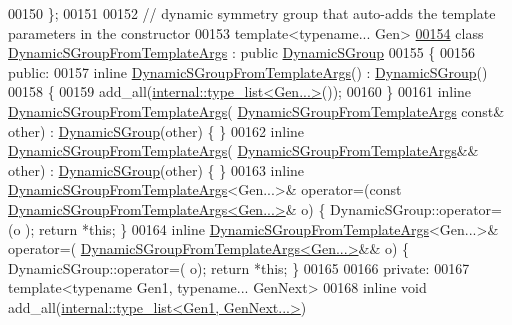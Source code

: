 \begin{DoxyCode}
00150 \};
00151 
00152 \textcolor{comment}{// dynamic symmetry group that auto-adds the template parameters in the constructor}
00153 \textcolor{keyword}{template}<\textcolor{keyword}{typename}... Gen>
\hyperlink{class_eigen_1_1_dynamic_s_group_from_template_args}{00154} \textcolor{keyword}{class }\hyperlink{class_eigen_1_1_dynamic_s_group_from_template_args}{DynamicSGroupFromTemplateArgs} : \textcolor{keyword}{public} 
      \hyperlink{class_eigen_1_1_dynamic_s_group}{DynamicSGroup}
00155 \{
00156   \textcolor{keyword}{public}:
00157     \textcolor{keyword}{inline} \hyperlink{class_eigen_1_1_dynamic_s_group_from_template_args}{DynamicSGroupFromTemplateArgs}() : 
      \hyperlink{class_eigen_1_1_dynamic_s_group}{DynamicSGroup}()
00158     \{
00159       add\_all(\hyperlink{struct_eigen_1_1internal_1_1type__list}{internal::type\_list<Gen...>}());
00160     \}
00161     \textcolor{keyword}{inline} \hyperlink{class_eigen_1_1_dynamic_s_group_from_template_args}{DynamicSGroupFromTemplateArgs}(
      \hyperlink{class_eigen_1_1_dynamic_s_group_from_template_args}{DynamicSGroupFromTemplateArgs} \textcolor{keyword}{const}& other) : 
      \hyperlink{class_eigen_1_1_dynamic_s_group}{DynamicSGroup}(other) \{ \}
00162     \textcolor{keyword}{inline} \hyperlink{class_eigen_1_1_dynamic_s_group_from_template_args}{DynamicSGroupFromTemplateArgs}(
      \hyperlink{class_eigen_1_1_dynamic_s_group_from_template_args}{DynamicSGroupFromTemplateArgs}&& other) : 
      \hyperlink{class_eigen_1_1_dynamic_s_group}{DynamicSGroup}(other) \{ \}
00163     \textcolor{keyword}{inline} \hyperlink{class_eigen_1_1_dynamic_s_group_from_template_args}{DynamicSGroupFromTemplateArgs}<Gen...>& operator=(\textcolor{keyword}{const} 
      \hyperlink{class_eigen_1_1_dynamic_s_group_from_template_args}{DynamicSGroupFromTemplateArgs<Gen...>}& o) \{ DynamicSGroup::operator=(o
      ); \textcolor{keywordflow}{return} *\textcolor{keyword}{this}; \}
00164     \textcolor{keyword}{inline} \hyperlink{class_eigen_1_1_dynamic_s_group_from_template_args}{DynamicSGroupFromTemplateArgs}<Gen...>& operator=(
      \hyperlink{class_eigen_1_1_dynamic_s_group_from_template_args}{DynamicSGroupFromTemplateArgs<Gen...>}&& o) \{ DynamicSGroup::operator=(
      o); \textcolor{keywordflow}{return} *\textcolor{keyword}{this}; \}
00165   
00166   \textcolor{keyword}{private}:
00167     \textcolor{keyword}{template}<\textcolor{keyword}{typename} Gen1, \textcolor{keyword}{typename}... GenNext>
00168     \textcolor{keyword}{inline} \textcolor{keywordtype}{void} add\_all(\hyperlink{struct_eigen_1_1internal_1_1type__list}{internal::type\_list<Gen1, GenNext...>})

\end{DoxyCode}

